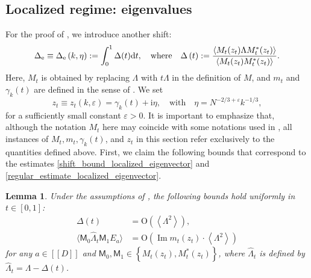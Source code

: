 \documentclass[10pt,reqno]{amsart}
\numberwithin{equation}{section}
\numberwithin{figure}{section}
\theoremstyle{plain} %
\newtheorem{lemma}[theorem]{Lemma}
\theoremstyle{definition} %
\renewcommand{\r}{\mathrm} \newcommand{\rr}{\mathrm} %
\newcommand{\wh}{\widehat}
\renewcommand{\txt}[1]{\text{\rm{#1}}}
\newcommand{\sM}{\mathsf M}
\newcommand{\ii}{\mathrm{i}}
\newcommand{\qq}[1]{[\![{#1}]\!]}
\newcommand{\pa}[1]{\left({#1}\right)}
\newcommand{\ha}[1]{\left\{{#1}\right\}}
\newcommand{\avg}[1]{\langle #1 \rangle}
\newcommand{\avga}[1]{\left\langle #1 \right\rangle}
\DeclareMathOperator{\im}{\mathrm{Im}}
\newcommand{\hLambda}{{\wh{\Lambda}}}
\newcommand{\be}{\begin{equation}}
\newcommand{\ee}{\end{equation}}
\newcommand{\e}{{\varepsilon}}
\newcommand{\OO}{\mathrm{O}}
\numberwithin{equation}{section}
\begin{document}
\subsection{Localized regime: eigenvalues}

For the proof of , we introduce another shift:
\begin{equation}\label{definition_shift_eigenvalue}
    \begin{aligned}      \Delta_{\txt{e}}\equiv\Delta_{\txt{e}}\pa{k,\eta}:=\int_{0}^{1}\Delta(t) \r d t,\quad \text{where}\quad \Delta\pa{t}:=\frac{\avga{M_t(z_t)\Lambda M_t^{*}(z_t)}}{\avga{M_t(z_t)M_t^*(z_t)}}.
    \end{aligned}
\end{equation}
Here, $M_t$ is obtained by replacing $\Lambda$ with $t\Lambda$ in the definition of $M$, and $m_t$ and $\gamma_k(t)$ are defined in the sense of . We set 
\be\label{eq:z1t}
z_t\equiv z_t(k,\e)=\gamma_k(t)+\r i \eta,\quad \text{with}\quad \eta = N^{-2/3+\varepsilon}k^{-1/3},
\ee
for a sufficiently small constant $\e>0$. 
It is important to emphasize that, although the notation $M_t$ here may coincide with some notations used in , all instances of $M_t,m_t,\gamma_k\pa{t}$, and $z_t$ in this section refer exclusively to the quantities defined above.
First, we claim the following bounds that correspond to the estimates \eqref{shift_bound_localized_eigenvector} and \eqref{regular_estimate_localized_eigenvector}.
\begin{lemma}\label{lem_regular_estimate_localized_eigenvalue}
    Under the assumptions of , the following bounds hold uniformly in $t\in[0,1]$:
    \begin{align}\label{shift_bound_localized_eigenvalue}
    \Delta(t)&=\OO\pa{\avga{\Lambda^2}},\\       \label{regular_estimate_localized_eigenvalue}
\avg{\sM_0\hLambda_t\sM_1E_a}&=\OO\pa{\im m_t(z_t)\cdot \avga{\Lambda^2}}
        \end{align}
for any $a\in \qq{D}$ and $\sM_0,\sM_1\in\ha{M_t\pa{z_t},M_t^*\pa{z_t}}$, where $\hLambda_t$ is defined by $\hLambda_t=\Lambda-\Delta\pa{t}$.
\end{lemma}
\end{document}
